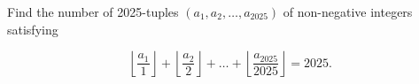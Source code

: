 Find the number of 2025-tuples $(a_1,a_2,\dots,a_{2025})$ of non-negative integers satisfying

$$\left\lfloor\dfrac{a_1}{1}\right\rfloor+\left\lfloor\dfrac{a_2}{2}\right\rfloor+\dots+\left\lfloor\dfrac{a_{2025}}{2025}\right\rfloor=2025.$$
